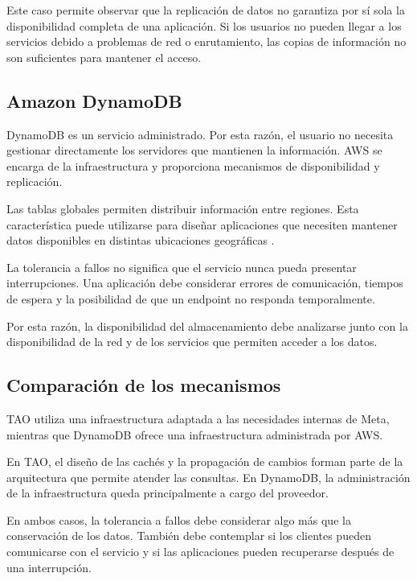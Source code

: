 \documentclass[12pt,a4paper]{article}
\begin{document}
Este caso permite observar que la replicación de datos no garantiza por sí sola la disponibilidad completa de una aplicación. Si los usuarios no pueden llegar a los servicios debido a problemas de red o enrutamiento, las copias de información no son suficientes para mantener el acceso.

\subsection{Amazon DynamoDB}

DynamoDB es un servicio administrado. Por esta razón, el usuario no necesita gestionar directamente los servidores que mantienen la información. AWS se encarga de la infraestructura y proporciona mecanismos de disponibilidad y replicación.

Las tablas globales permiten distribuir información entre regiones. Esta característica puede utilizarse para diseñar aplicaciones que necesiten mantener datos disponibles en distintas ubicaciones geográficas \cite{awsdynamodbglobaltables}.

La tolerancia a fallos no significa que el servicio nunca pueda presentar interrupciones. Una aplicación debe considerar errores de comunicación, tiempos de espera y la posibilidad de que un endpoint no responda temporalmente.

Por esta razón, la disponibilidad del almacenamiento debe analizarse junto con la disponibilidad de la red y de los servicios que permiten acceder a los datos.

\subsection{Comparación de los mecanismos}

TAO utiliza una infraestructura adaptada a las necesidades internas de Meta, mientras que DynamoDB ofrece una infraestructura administrada por AWS.

En TAO, el diseño de las cachés y la propagación de cambios forman parte de la arquitectura que permite atender las consultas. En DynamoDB, la administración de la infraestructura queda principalmente a cargo del proveedor.

En ambos casos, la tolerancia a fallos debe considerar algo más que la conservación de los datos. También debe contemplar si los clientes pueden comunicarse con el servicio y si las aplicaciones pueden recuperarse después de una interrupción.

\end{document}
